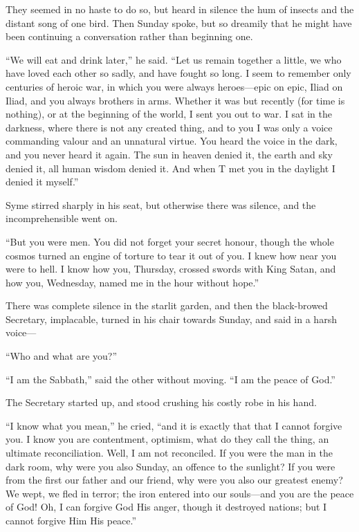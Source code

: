 \documentclass{book}
\begin{document}
They seemed in no haste to do so, but heard in silence the hum of insects and the distant song of one bird. Then Sunday spoke, but so dreamily that he might have been continuing a conversation rather than beginning one.

“We will eat and drink later,” he said. “Let us remain together a little, we who have loved each other so sadly, and have fought so long. I seem to remember only centuries of heroic war, in which you were always heroes—epic on epic, Iliad on Iliad, and you always brothers in arms. Whether it was but recently (for time is nothing), or at the beginning of the world, I sent you out to war. I sat in the darkness, where there is not any created thing, and to you I was only a voice commanding valour and an unnatural virtue. You heard the voice in the dark, and you never heard it again. The sun in heaven denied it, the earth and sky denied it, all human wisdom denied it. And when T met you in the daylight I denied it myself.”

Syme stirred sharply in his seat, but otherwise there was silence, and the incomprehensible went on.

“But you were men. You did not forget your secret honour, though the whole cosmos turned an engine of torture to tear it out of you. I knew how near you were to hell. I know how you, Thursday, crossed swords with King Satan, and how you, Wednesday, named me in the hour without hope.”

There was complete silence in the starlit garden, and then the black-browed Secretary, implacable, turned in his chair towards Sunday, and said in a harsh voice—

“Who and what are you?”

“I am the Sabbath,” said the other without moving. “I am the peace of God.”

The Secretary started up, and stood crushing his costly robe in his hand.

“I know what you mean,” he cried, “and it is exactly that that I cannot forgive you. I know you are contentment, optimism, what do they call the thing, an ultimate reconciliation. Well, I am not reconciled. If you were the man in the dark room, why were you also Sunday, an offence to the sunlight? If you were from the first our father and our friend, why were you also our greatest enemy? We wept, we fled in terror; the iron entered into our souls—and you are the peace of God! Oh, I can forgive God His anger, though it destroyed nations; but I cannot forgive Him His peace.”
\end{document}
